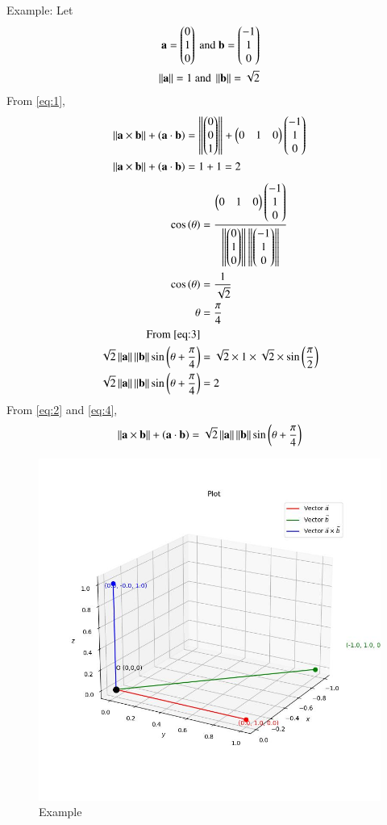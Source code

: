 \documentclass[journal]{IEEEtran}
\begin{document}
Example:
Let
\begin{align*}
    \mathbf{a}=\begin{pmatrix}0 \\ 1 \\ 0\end{pmatrix}\text{ and }\mathbf{b}=\begin{pmatrix}-1 \\ 1 \\ 0\end{pmatrix} \\
    \left\lVert\mathbf{a}\right\rVert = 1\text{ and }\left\lVert\mathbf{b}\right\rVert = \sqrt{2} \\
\end{align*}
From \ref{eq:1},
\begin{align}
    \left\lVert\mathbf{a} \times \mathbf{b}\right\rVert + \left(\mathbf{a} \cdot \mathbf{b}\right) &= \left\lVert\begin{pmatrix}0 \\ 0 \\ 1\end{pmatrix}\right\rVert + \begin{pmatrix}0 & 1 &  0\end{pmatrix} \begin{pmatrix}-1 \\ 1 \\ 0\end{pmatrix} \\
    \left\lVert\mathbf{a} \times \mathbf{b}\right\rVert + \left(\mathbf{a} \cdot \mathbf{b}\right) &= 1 + 1 = 2 \label{eq:2}
\end{align}
\begin{align}
    \cos\left(\theta\right) &= \frac{\begin{pmatrix}0 & 1 &  0\end{pmatrix} \begin{pmatrix}-1 \\ 1 \\ 0\end{pmatrix}}{\left\lVert\begin{pmatrix}0 \\ 1 \\  0\end{pmatrix}\right\rVert\left\lVert\begin{pmatrix}-1 \\ 1 \\ 0\end{pmatrix}\right\rVert} \\
    \cos\left(\theta\right) &= \frac{1}{\sqrt{2}} \\
    \theta &= \frac{\pi}{4} \label{eq:3} \\
    \text{From \ref{eq:3}} \\
    \sqrt{2} \left\lVert\mathbf{a}\right\rVert \left\lVert\mathbf{b}\right\rVert \sin\left(\theta + \frac{\pi}{4}\right) &= \sqrt{2} \times 1 \times \sqrt{2} \times \sin\left(\frac{\pi}{2}\right) \\
    \sqrt{2} \left\lVert\mathbf{a}\right\rVert \left\lVert\mathbf{b}\right\rVert \sin\left(\theta + \frac{\pi}{4}\right) &= 2 \label{eq:4}
\end{align}
From \ref{eq:2} and \ref{eq:4},
\begin{align*}
\left\lVert\mathbf{a} \times \mathbf{b}\right\rVert + \left(\mathbf{a} \cdot \mathbf{b}\right) = \sqrt{2} \left\lVert\mathbf{a}\right\rVert \left\lVert\mathbf{b}\right\rVert \sin\left(\theta + \frac{\pi}{4}\right)
\end{align*}

\begin{figure}[h!]
    \centering
    \includegraphics[width=0.7\columnwidth]{figs/plot_c.jpg}
    \caption*{Example}
    \label{fig:fig}
\end{figure}
\end{document}
